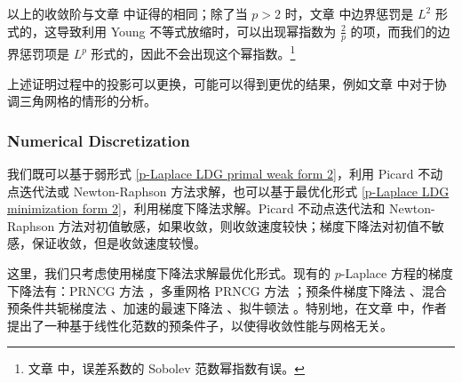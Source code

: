 \begin{remark}
	以上的收敛阶与文章 \cite{10.1007/s10915-019-00967-6} 中证得的相同；除了当 \(p>2\) 时，文章 \cite{10.1007/s10915-019-00967-6} 中边界惩罚是 \(L^2\) 形式的，这导致利用 Young 不等式放缩时，可以出现幂指数为 \(\frac{2}{p}\) 的项，而我们的边界惩罚项是 \(L^{p}\) 形式的，因此不会出现这个幂指数。\footnote{文章 \cite{10.1007/s10915-019-00967-6} 中，误差系数的 Sobolev 范数幂指数有误。}
\end{remark}

\begin{remark}
	上述证明过程中的投影可以更换，可能可以得到更优的结果，例如文章 \cite{10.1007/s10915-019-00967-6} 中对于协调三角网格的情形的分析。
\end{remark}





\subsubsection{Numerical Discretization}

我们既可以基于弱形式 \eqref{p-Laplace LDG primal weak form 2}，利用 Picard 不动点迭代法或 Newton-Raphson 方法求解，也可以基于最优化形式 \eqref{p-Laplace LDG minimization form 2}，利用梯度下降法求解。Picard 不动点迭代法和 Newton-Raphson 方法对初值敏感，如果收敛，则收敛速度较快；梯度下降法对初值不敏感，保证收敛，但是收敛速度较慢。

这里，我们只考虑使用梯度下降法求解最优化形式。现有的 \(p\)-Laplace 方程的梯度下降法有：PRNCG 方法 \cite{10.1090/S0025-5718-1993-1192966-4}，多重网格 PRNCG 方法 \cite{10.1137/S1064827598339098}；预条件梯度下降法 \cite{10.1007/s10915-007-9134-z}、混合预条件共轭梯度法 \cite{IJNAM-2-123}、加速的最速下降法 \cite{10.1016/j.amc.2013.07.096}、拟牛顿法 \cite{10.1016/j.cam.2016.06.026}。特别地，在文章 \cite{10.1007/s10915-007-9134-z} 中，作者提出了一种基于线性化范数的预条件子，以使得收敛性能与网格无关。

